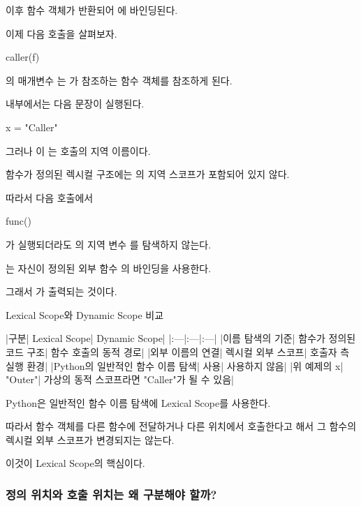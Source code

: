 이후  함수 객체가 반환되어 에 바인딩된다.

이제 다음 호출을 살펴보자.

\begin{dhkcode}
caller(f)
\end{dhkcode}

의 매개변수 는 가 참조하는  함수 객체를 참조하게 된다.

 내부에서는 다음 문장이 실행된다.

\begin{dhkcode}
x = "Caller"
\end{dhkcode}

그러나 이 는  호출의 지역 이름이다.

 함수가 정의된 렉시컬 구조에는 의 지역 스코프가 포함되어 있지 않다.

따라서 다음 호출에서

\begin{dhkcode}
func()
\end{dhkcode}

가 실행되더라도 의 지역 변수 를 탐색하지 않는다.

는 자신이 정의된 외부 함수 의 바인딩을 사용한다.

그래서 가 출력되는 것이다.

\begin{dhknote}
\begin{dhksmry}[centered]
Lexical Scope와 Dynamic Scope 비교
\end{dhksmry}
\end{dhknote}

\begin{dhktable}
|구분|	Lexical Scope|	Dynamic Scope|
|:---|:---|:---|
|이름 탐색의 기준|	함수가 정의된 코드 구조|	함수 호출의 동적 경로|
|외부 이름의 연결|	렉시컬 외부 스코프|	호출자 측 실행 환경|
|Python의 일반적인 함수 이름 탐색|	사용|	사용하지 않음|
|위 예제의 x|	"Outer"|	가상의 동적 스코프라면 "Caller"가 될 수 있음|
\end{dhktable}

Python은 일반적인 함수 이름 탐색에 Lexical Scope를 사용한다.

따라서 함수 객체를 다른 함수에 전달하거나 다른 위치에서 호출한다고 해서 그 함수의 렉시컬 외부 스코프가 변경되지는 않는다.

이것이 Lexical Scope의 핵심이다.

\subsubsection{정의 위치와 호출 위치는 왜 구분해야 할까?}


